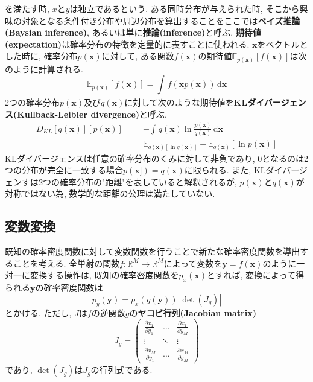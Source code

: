 \documentclass[twocolumn]{jarticle}
\begin{document}
を満たす時, ${x}$と${y}$は独立であるという.
ある同時分布が与えられた時, そこから興味の対象となる条件付き分布や周辺分布を算出することをここでは{\bf ベイズ推論(Baysian inference)}, あるいは単に{\bf 推論(inference)}と呼ぶ.
{\bf 期待値(expectation)}は確率分布の特徴を定量的に表すことに使われる. ${\bm {x}}$をベクトルとした時に, 確率分布${p(\bm {x})}$に対して, ある関数${f(\bm {x})}$の期待値${\mathbb{E}_{p(\bm {x})} [f(\bm {x})]}$は次のように計算される.
\begin{equation}
  \mathbb{E}_{p(\bm {x})} [f(\bm {x})] = \int_{}^{} f(\bm {x}p(\bm {x})) \,\mathrm{d}{\bm x}
\end{equation}
2つの確率分布${p(\bm {x})}$及び${q(\bm {x})}$に対して次のような期待値を{\bf KLダイバージェンス(Kullback-Leibler divergence)}と呼ぶ.
\begin{eqnarray}
  D_{KL}[q(\bm {x})][p(\bm {x})] &=& - \int_{}^{} q(\bm {x}) \ln \frac{p(\bm {x})}{q(\bm {x})}  \,\mathrm{d}{\bm {x}} \\
  &=& \mathbb{E}_{q(\bm {x})[\ln q(\bm {x})]} - \mathbb{E}_{q(\bm {x})}[\ln p(\bm {x})]
\end{eqnarray}
KLダイバージェンスは任意の確率分布のくみに対して非負であり, 0となるのは2つの分布が完全に一致する場合${p(\bm {x]}) = q(\bm {x})}$に限られる. また, KLダイバージェンすは2つの確率分布の"距離"を表していると解釈されるが, ${p(\bm {x})}$と${q(\bm {x})}$が対称ではない為, 数学的な距離の公理は満たしていない.

\subsection{変数変換}
既知の確率密度関数に対して変数関数を行うことで新たな確率密度関数を導出することを考える. 全単射の関数${f : \mathbb{R}^M \to \mathbb{R}^M}$によって変数を${\bm {y} = f(\bm {x})}$のように一対一に変換する操作は, 既知の確率密度関数を${p_{x}(\bm {x})}$とすれば, 変換によって得られる${\bm {y}}$の確率密度関数は
\begin{equation}
  p_y(\bm {y}) = p_x(g(\bm {y})) \left\lvert \det (J_g)\right\rvert
\end{equation}
とかける. ただし, ${J}$は${f}$の逆関数${g}$の{\bf ヤコビ行列(Jacobian matrix)}
\begin{equation}
  J_g = \left(
    \begin{array}{ccc}
      \frac{\partial x_1}{\partial y_1} & \ldots & \frac{\partial x_1}{\partial y_M} \\
      \vdots & \ddots & \vdots \\
      \frac{\partial x_M}{\partial y_1} & \ldots & \frac{\partial x_M}{\partial y_M}
    \end{array}
  \right)
\end{equation}
であり, ${\det (J_g)}$は${J_g}$の行列式である.
\end{document}
